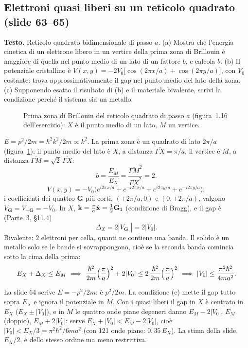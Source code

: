 \documentclass[11pt,a4paper]{article}
\begin{document}
\subsection{Elettroni quasi liberi su un reticolo quadrato (slide 63--65)}
\textbf{Testo.} Reticolo quadrato bidimensionale di passo $a$. (a) Mostra che l'energia cinetica di un elettrone libero in un vertice della prima zona
di Brillouin è maggiore di quella nel punto medio di un lato di un fattore $b$, e calcola $b$. (b) Il potenziale cristallino è
$V(x,y)=-2V_0\bigl[\cos(2\pi x/a)+\cos(2\pi y/a)\bigr]$, con $V_0$ costante: trova approssimativamente il gap nel punto medio del lato della zona.
(c) Supponendo esatto il risultato di (b) e il materiale bivalente, scrivi la condizione perché il sistema sia un metallo.

\begin{figure}[H]
\centering
{}
\caption{Prima zona di Brillouin del reticolo quadrato di passo $a$ (figura~1.16 dell'esercizio): $X$ è il punto medio di un lato, $M$ un vertice.}\label{fig:zona2d}
\end{figure}

\begin{esempio}[soluzione]
$E=p^2/2m=\hbar^2k^2/2m\propto k^2$. La prima zona è un quadrato di lato $2\pi/a$ (figura~\ref{fig:zona2d}): il punto medio del lato è $X$, a distanza
$\overline{\Gamma X}=\pi/a$, il vertice è $M$, a distanza $\overline{\Gamma M}=\sqrt2\,\overline{\Gamma X}$:
\[
b=\frac{E_M}{E_X}=\frac{\overline{\Gamma M}^2}{\overline{\Gamma X}^2}=2 .
\]
\[
V(x,y)=-V_0\bigl(e^{i2\pi x/a}+e^{-i2\pi x/a}+e^{i2\pi y/a}+e^{-i2\pi y/a}\bigr):
\]
i coefficienti dei quattro $\mathbf G$ più corti, $(\pm2\pi/a,0)$ e $(0,\pm2\pi/a)$, valgono $V_{\mathbf G}=V_{-\mathbf G}=-V_0$. In $X$,
$\mathbf k=\frac\pi a\hat{\mathbf x}=\frac12\mathbf G_1$ (condizione di Bragg), e il gap è (Parte~3, §11.4)
\[
\Delta_X=2|V_{\mathbf G_1}|=2|V_0| .
\]
Bivalente: 2 elettroni per cella, quanti ne contiene una banda. Il solido è un metallo solo se le bande si sovrappongono, cioè se la seconda banda
comincia sotto la cima della prima:
\[
E_X+\Delta_X\le E_M\ \Longrightarrow\ \frac{\hbar^2}{2m}\Bigl(\frac\pi a\Bigr)^2+2|V_0|\le2\,\frac{\hbar^2}{2m}\Bigl(\frac\pi a\Bigr)^2
\ \Longrightarrow\ |V_0|\le\frac{\pi^2\hbar^2}{4ma^2}.
\]
\end{esempio}
\begin{osservazione}
La slide 64 scrive $E=-p^2/2m$: è $p^2/2m$. La condizione (c) mette il gap tutto sopra $E_X$ e ignora il potenziale in $M$. Con i quasi liberi il gap in
$X$ è centrato in $E_X$ ($E_X\pm|V_0|$), e in $M$ le quattro onde piane degeneri danno $E_M-2|V_0|$, $E_M$ (doppio), $E_M+2|V_0|$: serve
$E_X+|V_0|<E_M-2|V_0|$, cioè $|V_0|<E_X/3=\pi^2\hbar^2/6ma^2$ (con 121 onde piane: $0{,}35\,E_X$). La stima della slide, $E_X/2$, è dello stesso ordine
ma meno restrittiva.
\end{osservazione}
\end{document}
